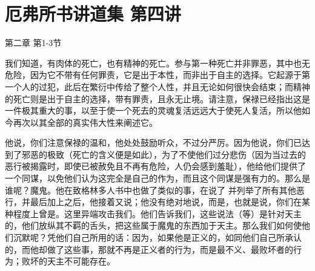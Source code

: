 

\section{厄弗所书讲道集 第四讲}

第二章 第1-3节 \par

\par

我们知道，有肉体的死亡，也有精神的死亡。参与第一种死亡并非罪恶，其中也无危险，因为它不带有任何罪责，它是出于本性，而非出于自主的选择。它起源于第一个人的过犯，此后在繁衍中传给了整个人性，并且无论如何很快会结束；而精神的死亡则是出于自主的选择，带有罪责，且永无止境。请注意，保禄已经指出这是一件极其重大的事，以至于使一个死去的灵魂复活远远大于使死人复活，所以他如今再次以其全部的真实伟大性来阐述它。\par

他说，你们注意保禄的温和，他处处鼓励听众，不过分严厉。因为他说，你们已达到了邪恶的极致（死亡的含义便是如此），为了不使他们过分悲伤（因为当过去的恶行被揭露时，即使已被赦免且不再有危险，人仍会感到羞耻），他给他们提供了一个同谋，以免他们认为这完全是自己的作为，而且这个同谋是强有力的。那么是谁呢？魔鬼。他在致格林多人书中也做了类似的事，在说了 并列举了所有其他恶行，并最后加上之后，他接着又说；他没有绝对地说，而是，也就是说，你们在某种程度上曾是。这里异端攻击我们。他们告诉我们，这些说法（等）是针对天主的，他们放纵其不羁的舌头，把这些属于魔鬼的东西加于天主。那么我们如何使他们沉默呢？凭他们自己所用的话：因为，如果他是正义的，如同他们自己所承认的，而他却做了这些事，那就不再是正义者的行为，而是最不义、最败坏者的行为；败坏的天主不可能存在。\par

